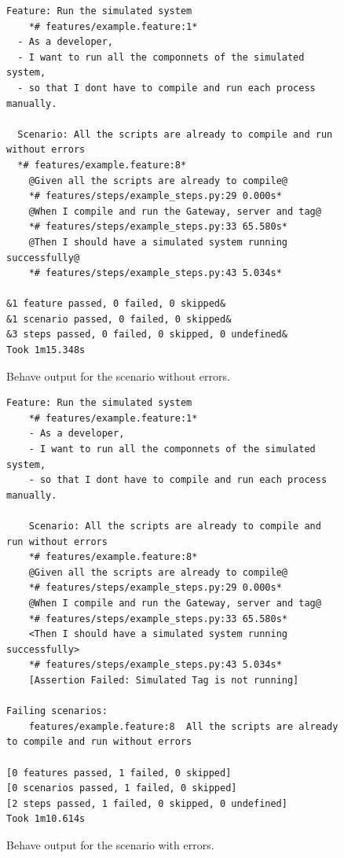 \documentclass[journal]{IEEEtran}	%
\begin{document}
\begin{figure}[t]
\centering
\begin{lstlisting}[style=okstyle]
Feature: Run the simulated system 
    *# features/example.feature:1*
  - As a developer,
  - I want to run all the componnets of the simulated system,
  - so that I dont have to compile and run each process manually.

  Scenario: All the scripts are already to compile and run without errors  
  *# features/example.feature:8*
    @Given all the scripts are already to compile@                           
    *# features/steps/example_steps.py:29 0.000s*
    @When I compile and run the Gateway, server and tag@                    
    *# features/steps/example_steps.py:33 65.580s*
    @Then I should have a simulated system running successfully@             
    *# features/steps/example_steps.py:43 5.034s*

&1 feature passed, 0 failed, 0 skipped&
&1 scenario passed, 0 failed, 0 skipped&
&3 steps passed, 0 failed, 0 skipped, 0 undefined&
Took 1m15.348s
\end{lstlisting}
\caption{Behave output for the scenario without errors.}
\label{fig:behaveOK}
\end{figure}

\begin{figure}[t]
\centering
\begin{lstlisting}[style=okstyle]
Feature: Run the simulated system 
    *# features/example.feature:1*
    - As a developer,
    - I want to run all the componnets of the simulated system,
    - so that I dont have to compile and run each process manually.

    Scenario: All the scripts are already to compile and run without errors  
    *# features/example.feature:8*
    @Given all the scripts are already to compile@                          
    *# features/steps/example_steps.py:29 0.000s*
    @When I compile and run the Gateway, server and tag@                     
    *# features/steps/example_steps.py:33 65.580s*
    <Then I should have a simulated system running successfully>         
    *# features/steps/example_steps.py:43 5.034s*
    [Assertion Failed: Simulated Tag is not running]

Failing scenarios:
    features/example.feature:8  All the scripts are already to compile and run without errors
    
[0 features passed, 1 failed, 0 skipped]
[0 scenarios passed, 1 failed, 0 skipped]
[2 steps passed, 1 failed, 0 skipped, 0 undefined]
Took 1m10.614s
\end{lstlisting}
\caption{Behave output for the scenario with errors.}
\label{fig:behaveBAD}
\end{figure}
\end{document}
